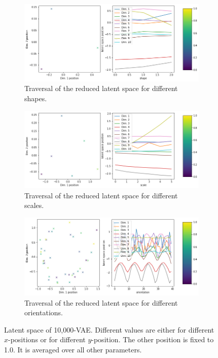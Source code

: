 \begin{figure}[H]
    \centering
    \begin{subfigure}{.48\textwidth}
        \includegraphics[width=\textwidth]{images/latent_space_traversals/vae_10000_dsprites_latent_space_values_shape.png}
        \caption{Traversal of the reduced latent space for different shapes.}
    \end{subfigure}
    \begin{subfigure}{.48\textwidth}
        \includegraphics[width=\textwidth]{images/latent_space_traversals/vae_10000_dsprites_latent_space_values_scale.png}
        \caption{Traversal of the reduced latent space for different scales.}
    \end{subfigure}
    \begin{subfigure}{.48\textwidth}
        \includegraphics[width=\textwidth]{images/latent_space_traversals/vae_10000_dsprites_latent_space_values_orientation.png}
        \caption{Traversal of the reduced latent space for different orientations.}
    \end{subfigure}
    \caption[10,000-VAE - Latent Space Values]{Latent space of 10,000-\ac{VAE}. Different values are either for different $x$-positions or for different $y$-position. The other position is fixed to 1.0. It is averaged over all other parameters.}
    \label{fig:vae_dsprites_10000_latent_space_position}
\end{figure}

